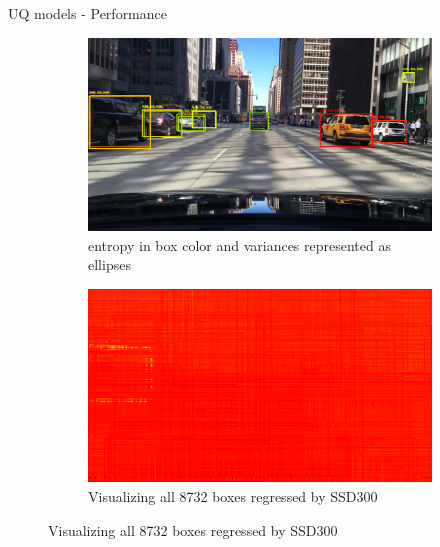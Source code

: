 \documentclass[10pt, aspectratio=169]{beamer}
\begin{document}
\begin{frame}[allowframebreaks]{UQ models - Performance}
    \begin{figure}[H]
        \captionsetup[table]{skip=0pt}
           \centering
           \begin{subfigure}[t]{0.495\textwidth}
               \centering
               \includegraphics[width=\textwidth]{images/det_images/bdd_bnn_variances_1.png}
               \caption{entropy in box color and variances represented as ellipses }
           \end{subfigure}
           \begin{subfigure}[t]{0.495\textwidth}
               \centering
               \includegraphics[width=\textwidth]{images/det_images/all_bnn_bdd_1.png}
               \caption{Visualizing all 8732 boxes regressed by SSD300}
           \end{subfigure}
           

\end{figure}
\end{frame}
\end{document}
